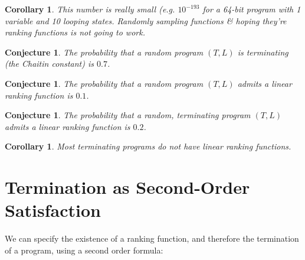 \documentclass[preprint]{sigplanconf}
\newtheorem{corollary}[theorem]{Corollary}
\newtheorem{conjecture}[theorem]{Conjecture}
\theoremstyle{definition}
\begin{document}
\begin{corollary}
 This number is really small (e.g. $10^{-193}$ for a 64-bit program with 1 variable and 10 looping states.
 Randomly sampling functions \& hoping they're ranking functions is not going to work.
\end{corollary}


\begin{conjecture}
 The probability that a random program $(T, L)$ is terminating (the Chaitin constant)
 is $0.7$.
\end{conjecture}

\begin{conjecture}
 The probability that a random program $(T, L)$ admits a linear ranking function is
 $0.1$.
\end{conjecture}

\begin{conjecture}
 The probability that a random, terminating program $(T, L)$ admits a linear ranking function
 is $0.2$.
\end{conjecture}


\begin{corollary}
 Most terminating programs do not have linear ranking functions.
\end{corollary}


\section{Termination as Second-Order Satisfaction}
We can specify the existence of a ranking function, and therefore the termination
of a program, using a second order formula:
\end{document}
